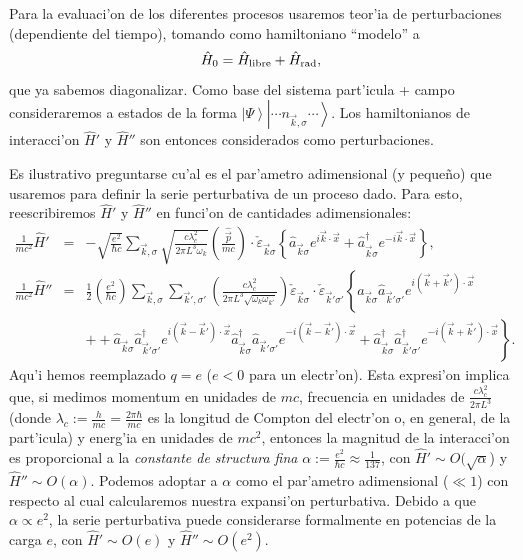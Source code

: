 Para la evaluaci'on de los diferentes procesos usaremos teor'ia de
perturbaciones (dependiente del tiempo), tomando como hamiltoniano ``modelo'' a
\begin{equation}
\hat{H}_0=\hat{H}_{\rm libre}+\hat{H}_{\rm rad}, \label{H0}
\end{equation} 
que ya sabemos diagonalizar. Como base del sistema part'icula + campo
consideraremos a estados de la forma $\left|\Psi\right\rangle \left|\cdots
n_{\vec{k},\sigma}\cdots\right\rangle $. Los hamiltonianos de interacci'on
$\hat{H}'$ y
$\hat{H}''$ son entonces considerados como perturbaciones.

Es ilustrativo preguntarse cu'al es el par'ametro adimensional (y peque\~no) que
usaremos para definir la serie perturbativa de un proceso dado. Para esto,
reescribiremos $\hat{H}'$ y $\hat{H}''$ en funci'on de cantidades
adimensionales:
\begin{eqnarray}
\frac{1}{mc^2}\hat{H}'&=&-\sqrt{\frac{e^2}{\hbar
c}}\sum_{\vec{k},\sigma}\sqrt{\frac{c\lambda_c^2}{2\pi  L^3\omega_k}}\left(
\frac{\hat{\vec{p}}}{mc}\right) \cdot\check{\varepsilon
}_{\vec{k}\sigma}\left\{ \hat{a}_{\vec{k}\sigma}%
e^{i\vec{k}\cdot\vec{x}}+\hat{a}_{\vec{k}\sigma}^\dagger e^{-i\vec{k}%
\cdot\vec{x}}\right\} ,\\
\frac{1}{mc^2}\hat{H}''&=&\frac{1}{2}\left( \frac{e^2}{\hbar c }\right) 
\sum_{\vec{k},\sigma}\sum_{\vec{k}',\sigma'}\left( \frac{c\lambda_c^2}{2\pi
L^3\sqrt{\omega_k\omega_{k'}}}
\right)\check{\varepsilon}_{\vec{k}\sigma}\cdot\check{\varepsilon}_{\vec{k}
'\sigma '}\left\{\hat{a}_{\vec{k}\sigma}\hat{a}_{\vec{k}'\sigma '}e^{i\left(
\vec{k}+\vec{k}'\right) \cdot\vec{x}}\right. \nonumber \\
&&\left.++\hat{a}_{\vec{k}\sigma}\hat{a}_{\vec{k}'\sigma '}^\dagger e^{i\left(
\vec{k}-\vec{k}'\right)
\cdot\vec{x}}\hat{a}_{\vec{k}\sigma}^\dagger \hat{a}_{\vec{k}'\sigma
'}e^{-i\left( \vec{k}-\vec{k}'\right)
\cdot\vec{x}}+\hat{a}_{\vec{k}\sigma}^\dagger \hat{a}_{\vec{k}'\sigma
'}^\dagger e^{-i\left( \vec{k}+\vec{k}'\right) \cdot\vec{x}}\right\}.
\end{eqnarray} 
Aqu'i hemos reemplazado $q=e$ ($e<0$ para un electr'on). Esta expresi'on
implica que, si medimos momentum en unidades de $mc$, frecuencia en unidades
de $\frac{c\lambda_c^2}{2\pi L^3}$ (donde
$\lambda_c:=\frac{h}{mc}=\frac{2\pi\hbar}{mc}$ es la longitud de Compton del
electr'on o, en general, de la part'icula) y  energ'ia en unidades de $mc^2$,
entonces la magnitud de la interacci'on es proporcional a la \textit{constante
de structura fina} $\alpha:=\frac{e^2}{\hbar c}\approx \frac{1}{137}$, con
$\hat{H}'\sim O(\sqrt{\alpha}$) y $\hat{H}''\sim O(\alpha)$. Podemos adoptar a
$\alpha$ como el par'ametro adimensional ($\ll 1$) con respecto al cual
calcularemos nuestra expansi'on perturbativa. Debido a que $\alpha\propto e^2$,
la serie perturbativa puede considerarse formalmente en potencias de la carga
$e$, con $\hat{H}'\sim O(e)$ y $\hat{H}''\sim O(e^2)$.

